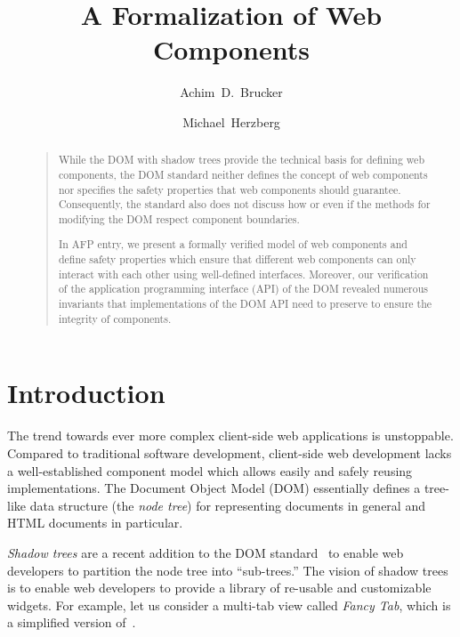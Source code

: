 \documentclass[10pt,DIV16,a4paper,abstract=true,twoside=semi,openright]
{scrreprt}
\title{A Formalization of Web Components}
\author{Achim~D.~Brucker \and Michael~Herzberg}%
\begin{document}
  \maketitle
  \begin{abstract}
    \begin{quote}
      While the DOM with shadow trees provide the technical basis for
      defining web components, the DOM standard neither defines the
      concept of web components nor specifies the safety properties
      that web components should guarantee. Consequently, the standard
      also does not discuss how or even if the methods for modifying
      the DOM respect component boundaries.
                  
      In AFP entry, we present a formally verified model of web
      components and define safety properties which ensure that
      different web components can only interact with each other using
      well-defined interfaces. Moreover, our verification of the
      application programming interface (API) of the DOM revealed
      numerous invariants that implementations of the DOM API need to
      preserve to ensure the integrity of components.

      \bigskip
    \end{quote}
  \end{abstract}


\tableofcontents
\cleardoublepage

\chapter{Introduction}
The trend towards ever more complex client-side web applications is
unstoppable. Compared to traditional software development, client-side
web development lacks a well-established component model which allows
easily and safely reusing implementations. The Document Object Model
(DOM) essentially defines a tree-like data structure (the \emph{node
tree}) for representing documents in general and HTML documents in
particular.

\emph{Shadow trees} are a recent addition to the DOM
standard~\cite{whatwg:dom:2019} to enable web developers to partition
the node tree into ``sub-trees.'' The vision of shadow trees is to
enable web developers to provide a library of re-usable and
customizable widgets. For example, let us consider a multi-tab view
called \emph{Fancy Tab}, which is a simplified version
of~\cite{bidelman:self-contained:2017}.
\end{document}
